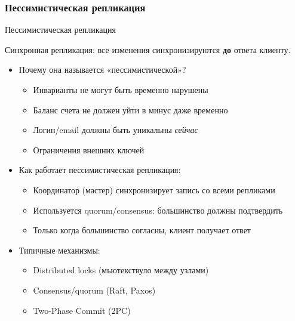 \documentclass{beamer}
\newenvironment{definitionbox}[1][Определение]{%
  \begin{exampleblock}{#1}
}{%
  \end{exampleblock}
}
\begin{document}
\begin{frame}
\frametitle{Пессимистическая репликация}

\begin{definitionbox}[Пессимистическая репликация]
Синхронная репликация: все изменения синхронизируются \textbf{до} ответа клиенту.
\end{definitionbox}

\begin{itemize}
  \item Почему она называется «пессимистической»?
  \begin{itemize}
    \item Инварианты не могут быть временно нарушены
    \item Баланс счета не должен уйти в минус даже временно
    \item Логин/email должны быть уникальны \textit{сейчас}
    \item Ограничения внешних ключей
  \end{itemize}
  \item Как работает пессимистическая репликация:
  \begin{itemize}
    \item Координатор (мастер) синхронизирует запись со всеми репликами
    \item Используется quorum/consensus: большинство должны подтвердить
    \item Только когда большинство согласны, клиент получает ответ
  \end{itemize}
  \item Типичные механизмы:
  \begin{itemize}
    \item Distributed locks (мьютекствуло между узлами)
    \item Consensus/quorum (Raft, Paxos)
    \item Two-Phase Commit (2PC)
  \end{itemize}
\end{itemize}

\end{frame}
\end{document}
